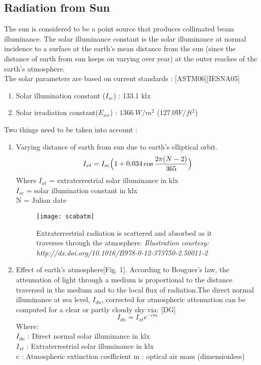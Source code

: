 \documentclass[times, 10pt,a4paper]{article}
\begin{document}
\subsection{Radiation from Sun}
The sun is considered to be a point source that produces collimated beam illuminance. The solar illuminance 
constant is the solar illuminance at normal incidence to a surface at the earth's mean distance from the sun 
(since the distance of earth from sun keeps on varying over year) at the outer reaches of the earth's atmosphere. \\
The solar parameters are based on current standards : [ASTM06][IESNA05]
\begin{enumerate}
\item Solar illumination constant ($I_{sc}$) : 133.1 klx
\item Solar irradiation constant($E_{irr}$) : $1366 \ W/m^2$ ($127.0 W/ft^2$)
\end{enumerate}
Two things need to be taken into account :
\begin{enumerate}
\item Varying distance of earth from sun due to earth's elliptical orbit. 
\begin{equation}
I_{xt} = I_{sc} \Big{(} 1 + 0.034 \cos {2\pi(N - 2) \over 365} \Big{)}
\end{equation}
Where
$I_{xt}$ = extraterrestrial solar illuminance in klx \\ 
$I_{sc}$ = solar illumination constant in klx \\ 
N = Julian date\\
\begin{figure}[htpb]
\centering
\texttt{[image: scabatm]}
\caption{Extraterrestrial radiation is scattered and absorbed as it traverses through the atmosphere. \emph{Illustration courtesy: 
http://dx.doi.org/10.1016/B978-0-12-373750-2.50011-2}}
\end{figure} 
\item Effect of earth's atmosphere[Fig. 1]. According to Bouguer's law, the attenuation of light through a
medium is proportional to the distance traversed in the medium and to the
local flux of radiation.The direct normal illuminance at sea level, $I_{dn}$, corrected for
atmospheric attenuation can be computed for a clear or partly cloudy sky via: [DG]
\begin{equation}
I_{dn} = I_{xt} e^{-cm} 
\end{equation}
Where: \\
$I_{dn}$ : Direct normal solar illuminance in klx \\
$I_{xt}$ : Extraterrestrial solar illuminance in klx \\ 
c : Atmospheric extinction coefficient
m : optical air mass (dimensionless) \\
\end{enumerate}
\end{document}

